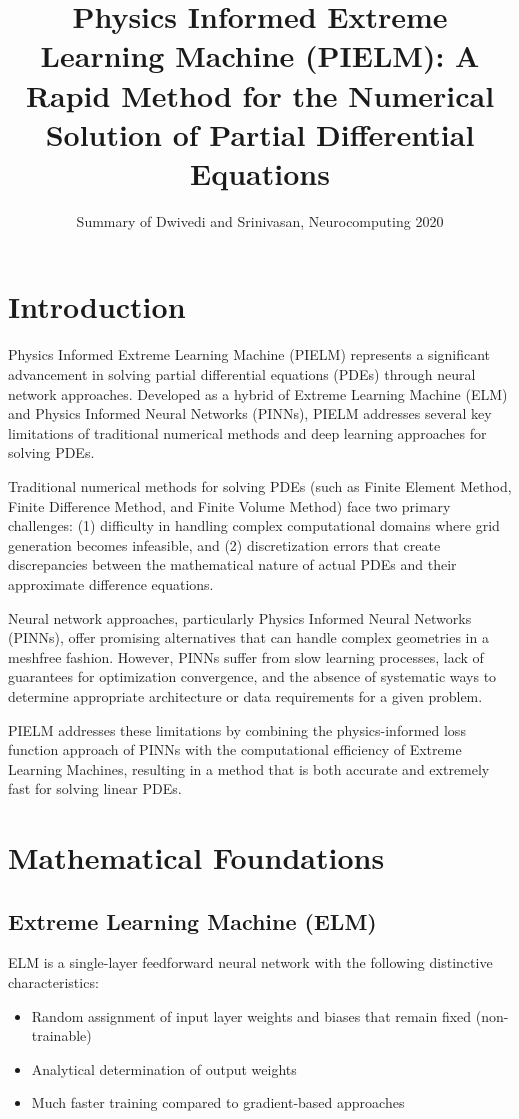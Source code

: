 \documentclass[11pt]{article}
\title{Physics Informed Extreme Learning Machine (PIELM): A Rapid Method for the Numerical Solution of Partial Differential Equations}
\author{Summary of Dwivedi and Srinivasan, Neurocomputing 2020}
\date{}
\begin{document}
\maketitle

\section{Introduction}

Physics Informed Extreme Learning Machine (PIELM) represents a significant advancement in solving partial differential equations (PDEs) through neural network approaches. Developed as a hybrid of Extreme Learning Machine (ELM) and Physics Informed Neural Networks (PINNs), PIELM addresses several key limitations of traditional numerical methods and deep learning approaches for solving PDEs.

Traditional numerical methods for solving PDEs (such as Finite Element Method, Finite Difference Method, and Finite Volume Method) face two primary challenges: (1) difficulty in handling complex computational domains where grid generation becomes infeasible, and (2) discretization errors that create discrepancies between the mathematical nature of actual PDEs and their approximate difference equations.

Neural network approaches, particularly Physics Informed Neural Networks (PINNs), offer promising alternatives that can handle complex geometries in a meshfree fashion. However, PINNs suffer from slow learning processes, lack of guarantees for optimization convergence, and the absence of systematic ways to determine appropriate architecture or data requirements for a given problem.

PIELM addresses these limitations by combining the physics-informed loss function approach of PINNs with the computational efficiency of Extreme Learning Machines, resulting in a method that is both accurate and extremely fast for solving linear PDEs.

\section{Mathematical Foundations}

\subsection{Extreme Learning Machine (ELM)}

ELM is a single-layer feedforward neural network with the following distinctive characteristics:
\begin{itemize}
    \item Random assignment of input layer weights and biases that remain fixed (non-trainable)
    \item Analytical determination of output weights
    \item Much faster training compared to gradient-based approaches
\end{itemize}
\end{document}
